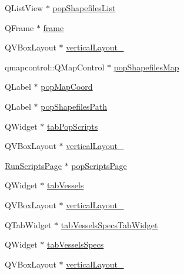\begin{DoxyCompactItemize}
\item 
Q\+List\+View $\ast$ \mbox{\hyperlink{class_ui___vessel_editor_main_window_a2fb02ef2af316a97a04e364bc1a4b89b}{pop\+Shapefiles\+List}}
\item 
Q\+Frame $\ast$ \mbox{\hyperlink{class_ui___vessel_editor_main_window_a267d9ae83ae0ac5221bf47e420f175ef}{frame}}
\item 
Q\+V\+Box\+Layout $\ast$ \mbox{\hyperlink{class_ui___vessel_editor_main_window_aeab5f0b852ee615571800aa9cbe20149}{vertical\+Layout\+\_}}
\item 
qmapcontrol\+::\+Q\+Map\+Control $\ast$ \mbox{\hyperlink{class_ui___vessel_editor_main_window_a6536fe35b52dd66c8f82128811695329}{pop\+Shapefiles\+Map}}
\item 
Q\+Label $\ast$ \mbox{\hyperlink{class_ui___vessel_editor_main_window_a48a711bd6d538d504507dc6a3eeaeb3a}{pop\+Map\+Coord}}
\item 
Q\+Label $\ast$ \mbox{\hyperlink{class_ui___vessel_editor_main_window_ac164d65a378864d5d25de51b412183a6}{pop\+Shapefiles\+Path}}
\item 
Q\+Widget $\ast$ \mbox{\hyperlink{class_ui___vessel_editor_main_window_a43e5880145719ce9a4ff3c875ee7767c}{tab\+Pop\+Scripts}}
\item 
Q\+V\+Box\+Layout $\ast$ \mbox{\hyperlink{class_ui___vessel_editor_main_window_aa30579bc3ee49107b885254c413db7c3}{vertical\+Layout\+\_}}
\item 
\mbox{\hyperlink{class_run_scripts_page}{Run\+Scripts\+Page}} $\ast$ \mbox{\hyperlink{class_ui___vessel_editor_main_window_aed5c491b3281d2ba161632a4f15a3668}{pop\+Scripts\+Page}}
\item 
Q\+Widget $\ast$ \mbox{\hyperlink{class_ui___vessel_editor_main_window_a8aa13ee88a8cd60728929f6ac7205dbd}{tab\+Vessels}}
\item 
Q\+V\+Box\+Layout $\ast$ \mbox{\hyperlink{class_ui___vessel_editor_main_window_a60d2eb7e93e6f4690b872cbe9735f586}{vertical\+Layout\+\_}}
\item 
Q\+Tab\+Widget $\ast$ \mbox{\hyperlink{class_ui___vessel_editor_main_window_ac0a9224f7796b5ddf3cd00e744f6557e}{tab\+Vessels\+Specs\+Tab\+Widget}}
\item 
Q\+Widget $\ast$ \mbox{\hyperlink{class_ui___vessel_editor_main_window_afb97007c4529c8803cff5e648eb77ce7}{tab\+Vessels\+Specs}}
\item 
Q\+V\+Box\+Layout $\ast$ \mbox{\hyperlink{class_ui___vessel_editor_main_window_a5e5b7f44bff304040b6da20271b75114}{vertical\+Layout\+\_}}
\item 

\end{DoxyCompactItemize}
